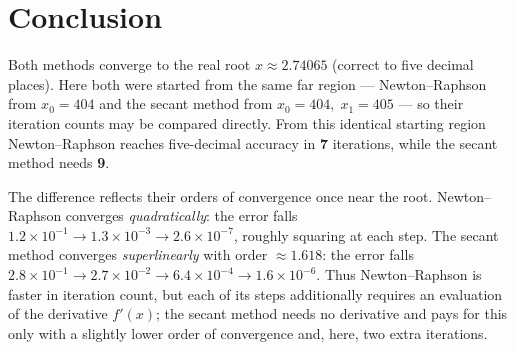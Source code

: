 \documentclass[11pt,a4paper]{article}
\begin{document}
\section*{Conclusion}
Both methods converge to the real root $x\approx2.74065$ (correct to five decimal
places). Here both were started from the same far region --- Newton--Raphson from
$x_{0}=404$ and the secant method from $x_{0}=404,\;x_{1}=405$ --- so their
iteration counts may be compared directly. From this identical starting region
Newton--Raphson reaches five-decimal accuracy in \textbf{7} iterations, while the
secant method needs \textbf{9}.

The difference reflects their orders of convergence once near the root.
Newton--Raphson converges \emph{quadratically}: the error falls
$1.2\times10^{-1}\to1.3\times10^{-3}\to2.6\times10^{-7}$, roughly squaring at each
step. The secant method converges \emph{superlinearly} with order $\approx1.618$:
the error falls
$2.8\times10^{-1}\to2.7\times10^{-2}\to6.4\times10^{-4}\to1.6\times10^{-6}$. Thus
Newton--Raphson is faster in iteration count, but each of its steps additionally
requires an evaluation of the derivative $f'(x)$; the secant method needs no
derivative and pays for this only with a slightly lower order of convergence and,
here, two extra iterations.
\end{document}
